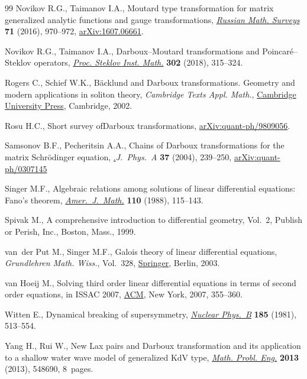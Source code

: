 \documentclass[10pt,a4paper]{amsart}
\numberwithin{equation}{section}
\begin{document}
\begin{thebibliography}{99}
Novikov R.G., Taimanov I.A., {M}outard type transformation for matrix
 generalized analytic functions and gauge transformations, \href{https://doi.org/10.1070/RM9741}{\textit{Russian
 Math. Surveys}} \textbf{71} (2016), 970--972, \href{https://arxiv.org/abs/1607.06661}{arXiv:1607.06661}.

Novikov R.G., Taimanov I.A., Darboux--{M}outard transformations and
 {P}oincar\'e--{S}teklov operators, \href{https://doi.org/10.1134/S0081543818060160}{\textit{Proc. Steklov Inst. Math.}}
 \textbf{302} (2018), 315--324.

Rogers C., Schief W.K., B\"acklund and {D}arboux transformations. {G}eometry
 and modern applications in soliton theory, \textit{Cambridge Texts Appl. Math.}, \href{https://doi.org/10.1017/CBO9780511606359}{Cambridge University Press}, Cambridge, 2002.

Rosu H.C., Short survey of{D}arboux transformations, \href{https://arxiv.org/abs/quant-ph/9809056}{arXiv:quant-ph/9809056}.

Samsonov B.F., Pecheritsin A.A., Chains of {D}arboux transformations for the
 matrix {S}chr\"odinger equation, \href{https://doi.org/10.1088/0305-4470/37/1/016}.{\textit{J.~Phys.~A}} \textbf{37} (2004),
 239--250, \href{https://arxiv.org/abs/quant-ph/0307145}{arXiv:quant-ph/0307145}

Singer M.F., Algebraic relations among solutions of linear differential
 equations: {F}ano's theorem, \href{https://doi.org/10.2307/2374541}{\textit{Amer.~J.~Math.}} \textbf{110} (1988),
 115--143.

Spivak M., A comprehensive introduction to differential geometry, {V}ol.~2,
 Publish or Perish, Inc., Boston, Mass., 1999.

van~der Put M., Singer M.F., Galois theory of linear differential equations,
 \textit{Grundlehren Math. Wiss.}, Vol.~328, \href{https://doi.org/10.1007/978-3-642-55750-7}{Springer}, Berlin, 2003.

van Hoeij M., Solving third order linear differential equations in terms of
 second order equations, in I{SSAC} 2007, \href{https://doi.org/10.1145/1277548.1277596}{ACM}, New York, 2007, 355--360.

Witten E., Dynamical breaking of supersymmetry, \href{https://doi.org/10.1016/0550-3213(81)90006-7}{\textit{Nuclear Phys.~B}}
 \textbf{185} (1981), 513--554.

Yang H., Rui W., New {L}ax pairs and {D}arboux transformation and its
 application to a shallow water wave model of generalized {K}d{V} type,
 \href{https://doi.org/10.1155/2013/548690}{\textit{Math. Probl. Eng.}} \textbf{2013} (2013), 548690, 8~pages.

\end{thebibliography}
\end{document}
